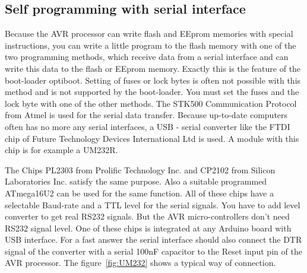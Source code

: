 \subsection{Self programming with serial interface}

Because the AVR processor can write flash and EEprom memories with special instructions,
you can write a little program to the flash memory with one of the two programming methods,
which receive data from a serial interface and can write this data to
the flash or EEprom memory.
Exactly this is the feature of the boot-loader optiboot.
Setting of fuses or lock bytes is often not possible with this method and
is not supported by the boot-loader.
You must set the fuses and the lock byte with one of the other methods.
The STK500 Communication Protocol from Atmel is used for the serial data transfer.
Because up-to-date computers often has no more any serial interfaces, 
a USB - serial converter like the FTDI chip of Future Technology Devices International Ltd
is used. A module with this chip is for example a UM232R.

The Chips PL2303 from Prolific Technology Inc. and CP2102 from Silicon Laboratories Inc. 
satisfy the same purpose.
Also a suitable programmed ATmega16U2 can be used for the same function.
All of these chips have a selectable Baud-rate and a TTL level for the serial signals.
You have to add level converter to get real RS232 signals.
But the AVR micro-controllers don't need RS232 signal level.
One of these chips is integrated at any Arduino board with USB interface.
For a fast answer the serial interface should also connect the DTR signal of
the converter with a serial 100nF capacitor to the Reset input pin of
the AVR processor. The figure~\ref{fig:UM232} shows a  typical way of connection.

